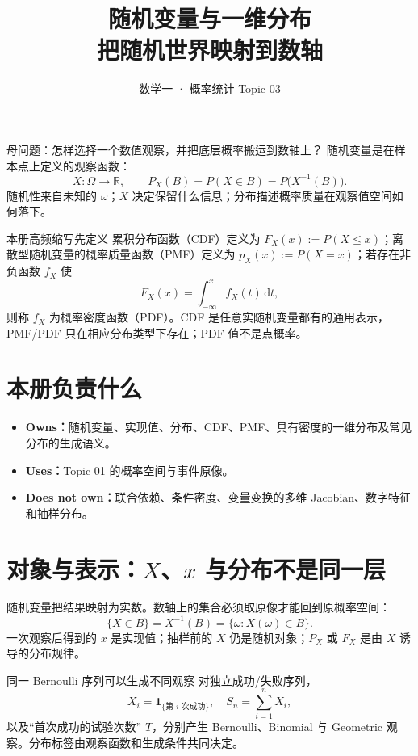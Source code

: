 \documentclass[11pt,a4paper]{ctexart}
\title{\vspace{-1.1cm}\textbf{随机变量与一维分布}\\[0.4em]\large 把随机世界映射到数轴}
\author{数学一 · 概率统计 Topic 03}\date{}
\newcommand{\kw}[1]{\textbf{\color{deep}#1}}
\begin{document}
\maketitle

\begin{corebox}{母问题：怎样选择一个数值观察，并把底层概率搬运到数轴上？}
随机变量是在样本点上定义的观察函数：
\[
\boxed{X:\Omega\to\mathbb R},\qquad P_X(B)=P(X\in B)=P\bigl(X^{-1}(B)\bigr).
\]
随机性来自未知的 $\omega$；$X$ 决定保留什么信息；分布描述概率质量在观察值空间如何落下。
\end{corebox}

\begin{corebox}{本册高频缩写先定义}
累积分布函数（CDF）定义为 $F_X(x):=P(X\le x)$；离散型随机变量的概率质量函数（PMF）定义为 $p_X(x):=P(X=x)$；若存在非负函数 $f_X$ 使
\[
F_X(x)=\int_{-\infty}^{x}f_X(t)\,\mathrm{d}t,
\]
则称 $f_X$ 为概率密度函数（PDF）。CDF 是任意实随机变量都有的通用表示，PMF/PDF 只在相应分布类型下存在；PDF 值不是点概率。
\end{corebox}

\section{本册负责什么}
\begin{itemize}
\item \kw{Owns：}随机变量、实现值、分布、CDF、PMF、具有密度的一维分布及常见分布的生成语义。
\item \kw{Uses：}Topic 01 的概率空间与事件原像。
\item \kw{Does not own：}联合依赖、条件密度、变量变换的多维 Jacobian、数字特征和抽样分布。
\end{itemize}

\section{对象与表示：$X$、$x$ 与分布不是同一层}
随机变量把结果映射为实数。数轴上的集合必须取原像才能回到原概率空间：
\[
\{X\in B\}=X^{-1}(B)=\{\omega:X(\omega)\in B\}.
\]
一次观察后得到的 $x$ 是实现值；抽样前的 $X$ 仍是随机对象；$P_X$ 或 $F_X$ 是由 $X$ 诱导的分布规律。

\begin{methodbox}{同一 Bernoulli 序列可以生成不同观察}
对独立成功/失败序列，
\[
X_i=\mathbf1_{\{\text{第 }i\text{ 次成功}\}},\quad S_n=\sum_{i=1}^nX_i,
\]
以及“首次成功的试验次数” $T$，分别产生 Bernoulli、Binomial 与 Geometric 观察。分布标签由观察函数和生成条件共同决定。
\end{methodbox}
\end{document}
